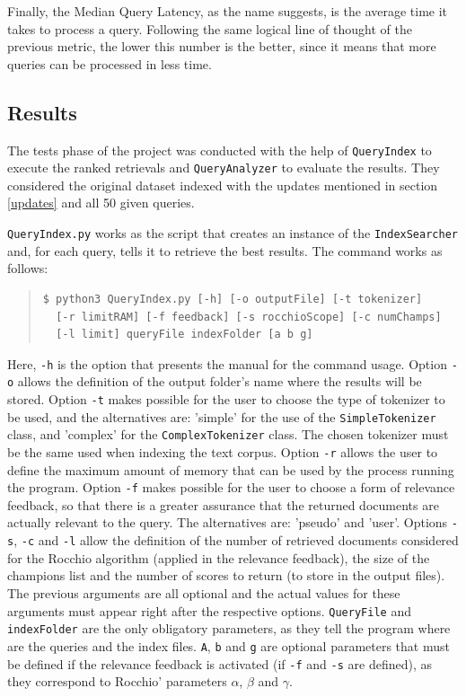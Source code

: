 \documentclass[12pt]{article}
\begin{document}
Finally, the Median Query Latency, as the name suggests, is the average time it
takes to process a query. 
Following the same logical line of thought of the previous metric, the lower 
this number is the better, since it means that more queries can be processed in 
less time.

\subsection{Results}\label{results}

The tests phase of the project was conducted with the help of \texttt{QueryIndex}
to execute the ranked retrievals and \texttt{QueryAnalyzer} to evaluate the results.
They considered the original dataset indexed with the updates mentioned in section
\ref{updates} and all 50 given queries.

\texttt{QueryIndex.py} works as the script that creates an instance of the 
\texttt{IndexSearcher} and, for each query, tells it to retrieve the best results.
The command works as follows:

\begingroup
\addtolength\leftmargini{-0.4in}
\addtolength\baselineskip{-0.05in}
\begin{quote}
\begin{verbatim}
$ python3 QueryIndex.py [-h] [-o outputFile] [-t tokenizer] 
  [-r limitRAM] [-f feedback] [-s rocchioScope] [-c numChamps] 
  [-l limit] queryFile indexFolder [a b g]
\end{verbatim}
\end{quote}
\endgroup

Here, \texttt{-h} is the option that presents the manual for the command usage.
Option \texttt{-o} allows the definition of the output folder's name where the
results will be stored.
Option \texttt{-t} makes possible for the user to choose the type of tokenizer
to be used, and the alternatives are: 'simple' for the use of the 
\texttt{SimpleTokenizer} class, and 'complex' for the \texttt{ComplexTokenizer} class.
The chosen tokenizer must be the same used when indexing the text corpus.
Option \texttt{-r} allows the user to define the maximum amount of memory that can
be used by the process running the program.
Option \texttt{-f} makes possible for the user to choose a form of relevance 
feedback, so that there is a greater assurance that the returned documents are
actually relevant to the query. 
The alternatives are: 'pseudo' and 'user'.
Options \texttt{-s}, \texttt{-c} and \texttt{-l} allow the definition of the 
number of retrieved documents considered for the Rocchio algorithm (applied in
the relevance feedback), the size of the champions list and the number of scores
to return (to store in the output files).
The previous arguments are all optional and the actual values for these arguments
must appear right after the respective options.
\texttt{QueryFile} and \texttt{indexFolder} are the only obligatory parameters,
as they tell the program where are the queries and the index files.
\texttt{A}, \texttt{b} and \texttt{g} are optional parameters that must be defined
if the relevance feedback is activated (if \texttt{-f} and \texttt{-s} are defined), 
as they correspond to Rocchio' parameters $\alpha$, $\beta$ and $\gamma$.
\end{document}
